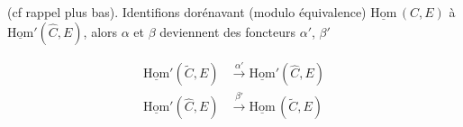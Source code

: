 
(cf rappel plus bas). Identifions dorénavant (modulo équivalence) $\underline{\mathrm{Hom}}\,(C,E)$ à $\underline{\mathrm{Hom}}'(\widehat C,E)$, alors $\alpha$ et $\beta$ deviennent des foncteurs $\alpha'$, $\beta'$

\[
\begin{aligned}
\underline{\mathrm{Hom}}'(\widetilde C,E)&\xrightarrow{\alpha'}\underline{\mathrm{Hom}}'(\widehat C,E)\\
\underline{\mathrm{Hom}}'(\widehat C,E)&\xrightarrow{\beta'}\underline{\mathrm{Hom}}\,(\widetilde C,E)
\end{aligned}
\]

